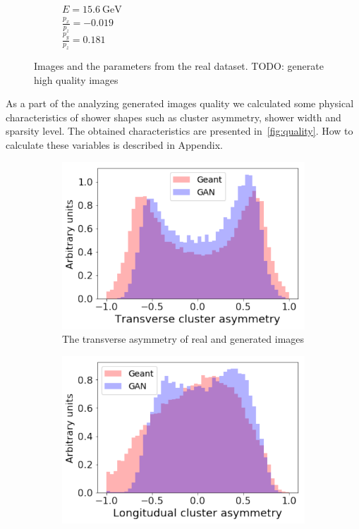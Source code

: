 \documentclass{webofc}
\newcommand{\todo}[1]{{\color{blue}TODO: #1}}
\begin{document}
\begin{figure}
\begin{subfigure}{0.24\textwidth}
    \caption{\\$E = 15.6~\text{GeV}$ \\  $\frac{p_x}{p_z}=-0.019$ \\ $\frac{p_y}{p_z}=0.181$}\label{fig:gen-imgs-4}
  \end{subfigure}
  \caption{Images and the parameters from the real dataset. \todo{generate high quality images}}
  \label{fig:gen-imgs}
\end{figure}


As a part of the analyzing generated images quality we calculated some physical characteristics of shower shapes such as cluster asymmetry, shower width and sparsity level. The obtained characteristics are presented in~\cref{fig:quality}. How to calculate these variables is described in Appendix.

\begin{figure}
  \centering
  \centering
  \begin{subfigure}{0.19\textwidth}
    \centering
    \includegraphics[width=1\textwidth]{figures/transverseAsymmetry.pdf}
    \caption{The transverse asymmetry of real and generated images}
  \end{subfigure}
  \begin{subfigure}{0.19\textwidth}
    \centering
    \includegraphics[width=1\textwidth]{figures/longAsymmetry.pdf}

\end{subfigure}
\end{figure}
\end{document}
